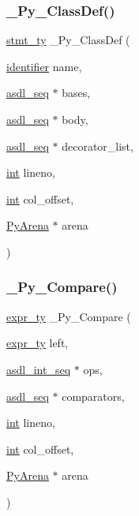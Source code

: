 \mbox{\label{_python-ast_8h_a4c475d7bf15d3fcf2565d6ed0bbdedad}} 
\subsubsection{\texorpdfstring{\_Py\_ClassDef()}{\_Py\_ClassDef()}}
{\footnotesize\ttfamily \mbox{\hyperlink{_python-ast_8h_a39618071027b661bc03e8916e664e1a7}{stmt\+\_\+ty}} \+\_\+\+Py\+\_\+\+Class\+Def (\begin{DoxyParamCaption}\item[{\mbox{\hyperlink{asdl_8h_a78ca2081e230a95abc88c411c9816775}{identifier}}}]{name,  }\item[{\mbox{\hyperlink{structasdl__seq}{asdl\+\_\+seq}} $\ast$}]{bases,  }\item[{\mbox{\hyperlink{structasdl__seq}{asdl\+\_\+seq}} $\ast$}]{body,  }\item[{\mbox{\hyperlink{structasdl__seq}{asdl\+\_\+seq}} $\ast$}]{decorator\+\_\+list,  }\item[{\mbox{\hyperlink{warnings_8h_a74f207b5aa4ba51c3a2ad59b219a423b}{int}}}]{lineno,  }\item[{\mbox{\hyperlink{warnings_8h_a74f207b5aa4ba51c3a2ad59b219a423b}{int}}}]{col\+\_\+offset,  }\item[{\mbox{\hyperlink{pyarena_8h_a9edeb357fbb27333471022a0975adb7a}{Py\+Arena}} $\ast$}]{arena }\end{DoxyParamCaption})}

\mbox{\label{_python-ast_8h_a2b463e29d526a83d1854ded8b88e9d7b}} 
\subsubsection{\texorpdfstring{\_Py\_Compare()}{\_Py\_Compare()}}
{\footnotesize\ttfamily \mbox{\hyperlink{_python-ast_8h_a56d3705e020a071405094a220c4592bd}{expr\+\_\+ty}} \+\_\+\+Py\+\_\+\+Compare (\begin{DoxyParamCaption}\item[{\mbox{\hyperlink{_python-ast_8h_a56d3705e020a071405094a220c4592bd}{expr\+\_\+ty}}}]{left,  }\item[{\mbox{\hyperlink{structasdl__int__seq}{asdl\+\_\+int\+\_\+seq}} $\ast$}]{ops,  }\item[{\mbox{\hyperlink{structasdl__seq}{asdl\+\_\+seq}} $\ast$}]{comparators,  }\item[{\mbox{\hyperlink{warnings_8h_a74f207b5aa4ba51c3a2ad59b219a423b}{int}}}]{lineno,  }\item[{\mbox{\hyperlink{warnings_8h_a74f207b5aa4ba51c3a2ad59b219a423b}{int}}}]{col\+\_\+offset,  }\item[{\mbox{\hyperlink{pyarena_8h_a9edeb357fbb27333471022a0975adb7a}{Py\+Arena}} $\ast$}]{arena }\end{DoxyParamCaption})}

